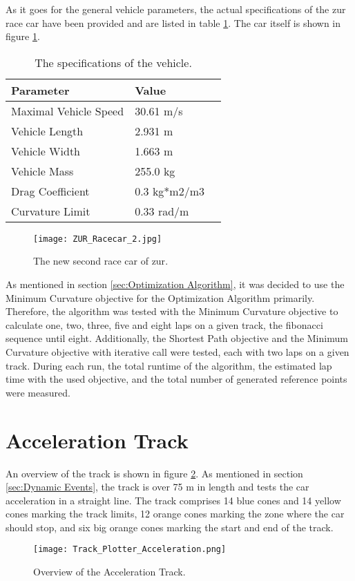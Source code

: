 As it goes for the general vehicle parameters, the actual specifications of the \acrshort{zur} race car have been provided and are listed in table \ref{tab:ZUR Vehicle Specifications}. The car itself is shown in figure \ref{fig:ZUR Racecar 2}.
\begin{table}[H]
    \centering
    \begin{tabular}{|l|l|l|}
        \hline
        \textbf{Parameter}    & \textbf{Value} \\ \hline
        Maximal Vehicle Speed & 30.61 m/s      \\ \hline
        Vehicle Length        & 2.931 m        \\ \hline
        Vehicle Width         & 1.663 m        \\ \hline
        Vehicle Mass          & 255.0 kg       \\ \hline
        Drag Coefficient      & 0.3 kg*m2/m3   \\ \hline
        Curvature Limit       & 0.33 rad/m     \\ \hline
    \end{tabular}
    \caption{The specifications of the vehicle.}
    \label{tab:ZUR Vehicle Specifications}
\end{table}
\begin{figure}[H]
    \centering
    \texttt{[image: ZUR\_Racecar\_2.jpg]}
    \caption{The new second race car of \acrlong{zur}.}
    \label{fig:ZUR Racecar 2}
\end{figure}

\pagebreak

As mentioned in section \ref{sec:Optimization Algorithm}, it was decided to use the Minimum Curvature objective for the Optimization Algorithm primarily. Therefore, the algorithm was tested with the Minimum Curvature objective to calculate one, two, three, five and eight laps on a given track, the \Gls{fibonacci} sequence until eight. Additionally, the Shortest Path objective and the Minimum Curvature objective with iterative call were tested, each with two laps on a given track. During each run, the total runtime of the algorithm, the estimated lap time with the used objective, and the total number of generated reference points were measured.

\section{Acceleration Track} \label{sec:Results Acceleration Track}
An overview of the track is shown in figure \ref{fig:Results Acceleration Initial}. As mentioned in section \ref{sec:Dynamic Events}, the track is over 75 m in length and tests the car acceleration in a straight line. The track comprises 14 blue cones and 14 yellow cones marking the track limits, 12 orange cones marking the zone where the car should stop, and six big orange cones marking the start and end of the track.
\begin{figure}[H]
    \centering
    \texttt{[image: Track\_Plotter\_Acceleration.png]}
    \caption{Overview of the Acceleration Track.}
    \label{fig:Results Acceleration Initial}
\end{figure}

